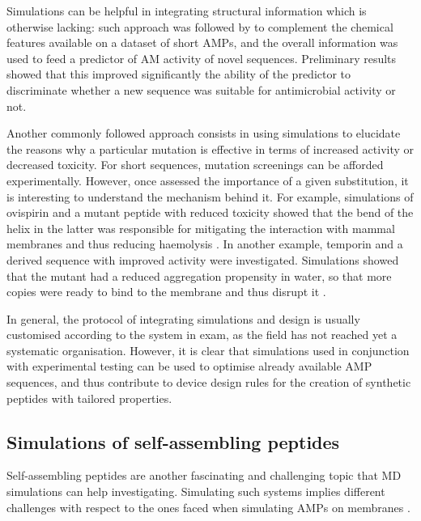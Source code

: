 Simulations can be helpful in integrating structural information which is otherwise lacking: such approach was followed by \citet{Liu2018} to complement the chemical features available on a dataset of short AMPs, and the overall information was used to feed a predictor of AM activity of novel sequences. Preliminary results showed that this improved significantly the ability of the predictor to discriminate whether a new sequence was suitable for antimicrobial activity or not.

Another commonly followed approach consists in using simulations to elucidate the reasons why a particular mutation is effective in terms of increased activity or decreased toxicity. For short sequences, mutation screenings can be afforded experimentally. However, once assessed the importance of a given substitution, it is interesting to understand the mechanism behind it.
%
For example, simulations of ovispirin and a mutant peptide with reduced toxicity showed that the bend of the helix in the latter was responsible for mitigating the interaction with mammal membranes and thus reducing haemolysis \citep{Khandelia2005}.
%
In another example, temporin and a derived sequence with improved activity were investigated. Simulations showed that the mutant had a reduced aggregation propensity in water, so that more copies were ready to bind to the membrane and thus disrupt it \citep{Farrotti2017}.

In general, the protocol of integrating simulations and design is usually customised according to the system in exam, as the field has not reached yet a systematic organisation.
%
However, it is clear that simulations used in conjunction with experimental testing can be used to optimise already available AMP sequences, and thus contribute to device design rules for the creation of synthetic peptides with tailored properties.


\subsection{Simulations of self-assembling peptides}
Self-assembling peptides are another fascinating and challenging topic that MD simulations can help investigating. Simulating such systems implies different challenges with respect to the ones faced when simulating AMPs on membranes \citep{Frederix2018,Orsi2018}.

